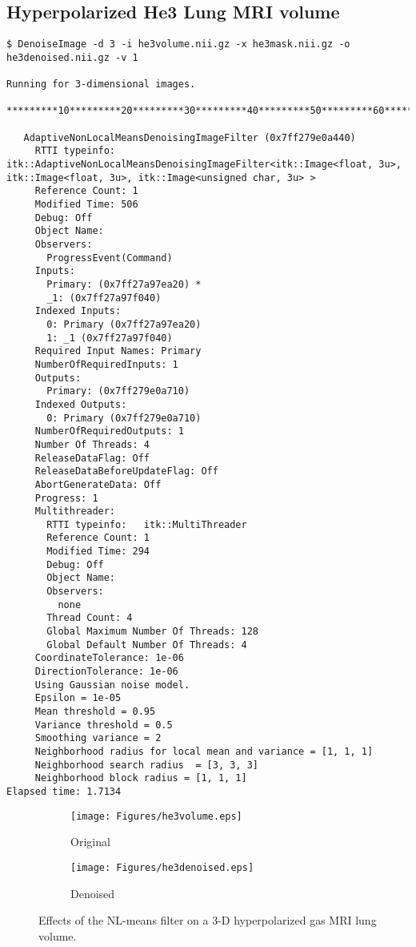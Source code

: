 \documentclass{InsightArticle}
\begin{document}
\subsection{Hyperpolarized He3 Lung MRI volume}

\small
\begin{verbatim}
$ DenoiseImage -d 3 -i he3volume.nii.gz -x he3mask.nii.gz -o he3denoised.nii.gz -v 1

Running for 3-dimensional images.

*********10*********20*********30*********40*********50*********60*********70*********80*********90*********

   AdaptiveNonLocalMeansDenoisingImageFilter (0x7ff279e0a440)
     RTTI typeinfo:   itk::AdaptiveNonLocalMeansDenoisingImageFilter<itk::Image<float, 3u>, itk::Image<float, 3u>, itk::Image<unsigned char, 3u> >
     Reference Count: 1
     Modified Time: 506
     Debug: Off
     Object Name:
     Observers:
       ProgressEvent(Command)
     Inputs:
       Primary: (0x7ff27a97ea20) *
       _1: (0x7ff27a97f040)
     Indexed Inputs:
       0: Primary (0x7ff27a97ea20)
       1: _1 (0x7ff27a97f040)
     Required Input Names: Primary
     NumberOfRequiredInputs: 1
     Outputs:
       Primary: (0x7ff279e0a710)
     Indexed Outputs:
       0: Primary (0x7ff279e0a710)
     NumberOfRequiredOutputs: 1
     Number Of Threads: 4
     ReleaseDataFlag: Off
     ReleaseDataBeforeUpdateFlag: Off
     AbortGenerateData: Off
     Progress: 1
     Multithreader:
       RTTI typeinfo:   itk::MultiThreader
       Reference Count: 1
       Modified Time: 294
       Debug: Off
       Object Name:
       Observers:
         none
       Thread Count: 4
       Global Maximum Number Of Threads: 128
       Global Default Number Of Threads: 4
     CoordinateTolerance: 1e-06
     DirectionTolerance: 1e-06
     Using Gaussian noise model.
     Epsilon = 1e-05
     Mean threshold = 0.95
     Variance threshold = 0.5
     Smoothing variance = 2
     Neighborhood radius for local mean and variance = [1, 1, 1]
     Neighborhood search radius  = [3, 3, 3]
     Neighborhood block radius = [1, 1, 1]
Elapsed time: 1.7134
\end{verbatim}
\normalsize

\begin{figure}[!ht]
\begin{subfigure}{0.5\textwidth}
  \centering
  \texttt{[image: Figures/he3volume.eps]}
  \caption{Original}
\end{subfigure}
\begin{subfigure}{0.5\textwidth}
  \centering
  \texttt{[image: Figures/he3denoised.eps]}
  \caption{Denoised}
\end{subfigure}
\caption{Effects of the NL-means filter on a 3-D hyperpolarized gas MRI lung volume.}
\end{figure}


%
%



\end{document}
